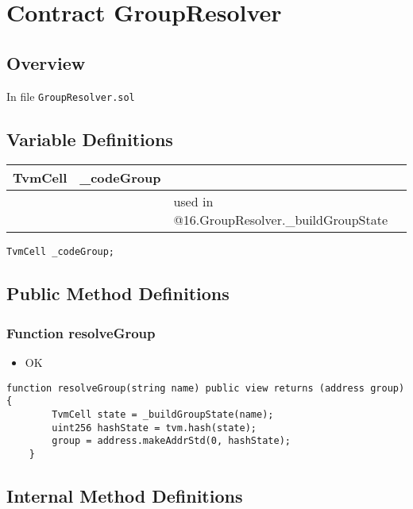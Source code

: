
\chapter{Contract GroupResolver}

\minitoc

\section{Overview}


In file {\tt GroupResolver.sol}

\section{Variable Definitions}


\ifsoltables
\noindent\begin{tabular}{|l|l|p{5cm}|}\hline
TvmCell & \_{}codeGroup &  \\\hline
 & & used in @16.GroupResolver.\_{}buildGroupState\\\hline
\end{tabular}
\fi


\begin{lstlisting}[firstnumber=8]
    TvmCell _codeGroup;
\end{lstlisting}

\section{Public Method Definitions}


\subsection{Function resolveGroup}

\begin{itemize}
\item OK
\end{itemize}

\begin{lstlisting}[firstnumber=10]
    function resolveGroup(string name) public view returns (address group) {
        TvmCell state = _buildGroupState(name);
        uint256 hashState = tvm.hash(state);
        group = address.makeAddrStd(0, hashState);
    }
\end{lstlisting}

\section{Internal Method Definitions}


